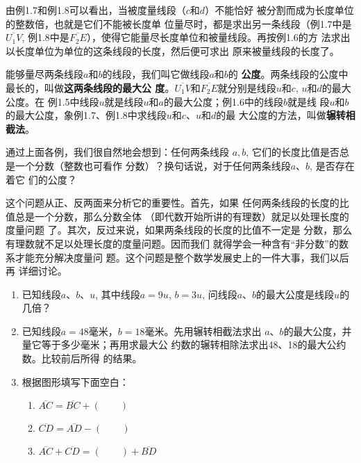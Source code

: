 由例1.7和例1.8可以看出，当被度量线段（$c$和$d$）不能恰好
被分割而成为长度单位的整数倍，也就是它们不能被长度单
位量尽时，都是求出另一条线段（例1.7中是$\overline{U_1V}$, 例1.8中是$\overline{F_2E}$），使得它能量尽长度单位和被量线段。再按例1.6的方
法求出以长度单位为单位的这条线段的长度，然后便可求出
原来被量线段的长度了。

能够量尽两条线段$a$和$b$的线段，我们叫它做线段$a$和$b$的
\textbf{公度}。两条线段的公度中最长的，叫做\textbf{这两条线段的最大公
度}。$\overline{U_1V}$和$\overline{F_2E}$就分别是线段$u$和$c$, $u$和$d$的最大公度。在
例1.5中线段$u$就是线段$u$和$a$的最大公度；例1.6中的线段$b$就是线
段$u$和$b$的最大公度，象例1.7、例1.8中求线段$u$和$c$、$u$和$d$的最
大公度的方法，叫做\textbf{辗转相截法}。

通过上面各例，我们很自然地会想到：任何两条线段
$a, b$, 它们的长度比值是否总是一个分数（整数也可看作
分数）？换句话说，对于任何两条线段$a$、$b$, 是否存在着它
们的公度？

这个问题从正、反两面来分析它的重要性。首先，如果
任何两条线段的长度的比值总是一个分数，那么分数全体
（即代数开始所讲的有理数）就足以处理长度的度量问题
了。其次，反过来说，如果两条线段的长度的比值不一定是
分数，那么有理数就不足以处理长度的度量问题。因而我们
就得学会一种含有“非分数”的数系才能充分解决度量问
题。这个问题是整个数学发展史上的一件大事，我们以后再
详细讨论。

\begin{ex}
\begin{enumerate}
	\item 已知线段$a$、$b$、$u$, 其中线段$a=9u$, $b=3u$, 问线段$a$、$b$的最大公度是线段$u$的几倍？
	\item 已知线段$a=48$毫米，$b=18$毫米。先用辗转相截法求出
	$a$、$b$的最大公度，并量它等于多少毫米；再用求最大公
	约数的辗转相除法求出48、18的最大公约数。比较前后所得
	的结果。
	\item 根据图形填写下面空白：
\begin{enumerate}
	\item $\overline{AC}=\overline{BC}+(\qquad)$	
	\item	$\overline{CD}=\overline{AD}-(\qquad)$	
	\item $\overline{AC}+\overline{CD}=(\qquad)+\overline{BD}$
\end{enumerate}
\begin{center}
\end{center}
\end{enumerate}
\end{ex}

